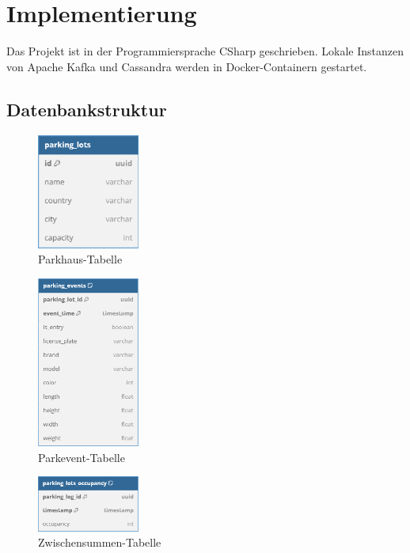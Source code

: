 \chapter{Implementierung}

Das Projekt ist in der Programmiersprache CSharp geschrieben.
Lokale Instanzen von Apache Kafka und Cassandra werden in Docker-Containern gestartet.


\section{Datenbankstruktur}

\begin{figure}[h!]%
    \centering%
    \includegraphics[width=0.3\textwidth]{Graphics/ParkingLotTable.png}%
    \caption{Parkhaus-Tabelle}%
\end{figure}%

\begin{figure}[h!]%
    \centering%
    \includegraphics[width=0.3\textwidth]{Graphics/parking_events.png}%
    \caption{Parkevent-Tabelle}%
\end{figure}%

\begin{figure}[h!]%
    \centering%
    \includegraphics[width=0.3\textwidth]{Graphics/occupancy.png}%
    \caption{Zwischensummen-Tabelle}%
\end{figure}%

